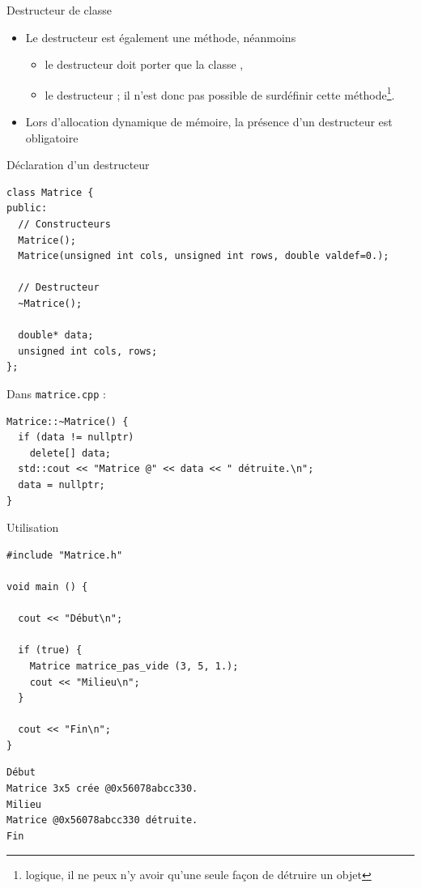 \documentclass[c]{beamer}
\begin{document}
\begin{frame}[fragile]{Destructeur de classe}
\begin{itemize}
\item Le destructeur est également une méthode, néanmoins

\begin{itemize}
\item le destructeur doit porter  que la classe ,

\item le destructeur ; il n'est donc pas possible de surdéfinir cette méthode\footnote{logique, il ne peux n'y avoir qu'une seule façon de détruire un objet}.
\end{itemize}

\item Lors d'allocation dynamique de mémoire, la présence d'un destructeur est obligatoire
\end{itemize}
\end{frame}


\begin{frame}[fragile]{Déclaration d'un destructeur}
\begin{verbatim}
class Matrice {
public:
  // Constructeurs
  Matrice();
  Matrice(unsigned int cols, unsigned int rows, double valdef=0.);

  // Destructeur
  ~Matrice();

  double* data;
  unsigned int cols, rows;
};
\end{verbatim}

Dans \texttt{matrice.cpp} :

\begin{verbatim}
Matrice::~Matrice() {
  if (data != nullptr)
    delete[] data;
  std::cout << "Matrice @" << data << " détruite.\n";
  data = nullptr;
}
\end{verbatim}

\end{frame}


\begin{frame}[fragile]{Utilisation}
\begin{verbatim}
#include "Matrice.h"

void main () {

  cout << "Début\n";

  if (true) {
    Matrice matrice_pas_vide (3, 5, 1.);
    cout << "Milieu\n";
  }

  cout << "Fin\n";
}
\end{verbatim}
\pause
\begin{verbatim}
Début
Matrice 3x5 crée @0x56078abcc330.
Milieu
Matrice @0x56078abcc330 détruite.
Fin
\end{verbatim}

\end{frame}
\end{document}
